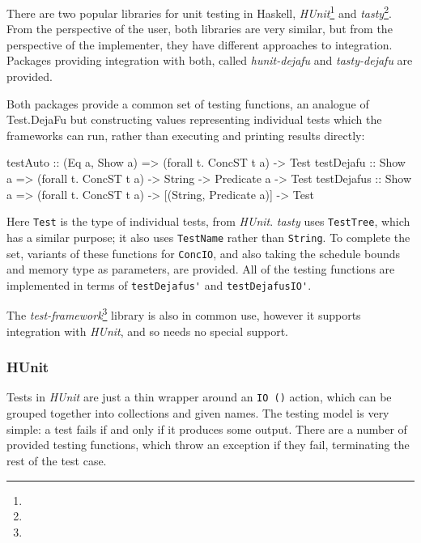 There are two popular libraries for unit testing in Haskell,
\emph{HUnit}\footnote{} and
\emph{tasty}\footnote{}. From the perspective of the
user, both libraries are very similar, but from the perspective of the
implementer, they have different approaches to integration. Packages
providing integration with both, called \emph{hunit-dejafu} and
\emph{tasty-dejafu} are provided.

Both packages provide a common set of testing functions, an analogue
of Test.\-DejaFu but constructing values representing individual tests
which the frameworks can run, rather than executing and printing
results directly:

\begin{haskellcode}
testAuto    :: (Eq a, Show a) => (forall t. ConcST t a) -> Test
testDejafu  :: Show a => (forall t. ConcST t a) -> String -> Predicate a -> Test
testDejafus :: Show a => (forall t. ConcST t a) -> [(String, Predicate a)] -> Test
\end{haskellcode}

Here \verb|Test| is the type of individual tests, from
\emph{HUnit}. \emph{tasty} uses \verb|TestTree|, which has a similar
purpose; it also uses \verb|TestName| rather than \verb|String|. To
complete the set, variants of these functions for \verb|ConcIO|, and
also taking the schedule bounds and memory type as parameters, are
provided. All of the testing functions are implemented in terms of
\verb|testDejafus'| and \verb|testDejafusIO'|.

The \emph{test-framework}\footnote{} library
is also in common use, however it supports integration with
\emph{HUnit}, and so needs no special support.

\subsubsection{HUnit}
\label{sec:practice-integration-hunit}

Tests in \emph{HUnit} are just a thin wrapper around an \verb|IO ()|
action, which can be grouped together into collections and given
names. The testing model is very simple: a test fails if and only if
it produces some output. There are a number of provided testing
functions, which throw an exception if they fail, terminating the rest
of the test case.


